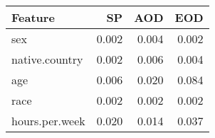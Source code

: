 \begin{tabular}{lrrr}
\toprule
Feature & SP & AOD & EOD \\
\midrule
sex & 0.002 & 0.004 & 0.002 \\
native.country & 0.002 & 0.006 & 0.004 \\
age & 0.006 & 0.020 & 0.084 \\
race & 0.002 & 0.002 & 0.002 \\
hours.per.week & 0.020 & 0.014 & 0.037 \\
\bottomrule
\end{tabular}
